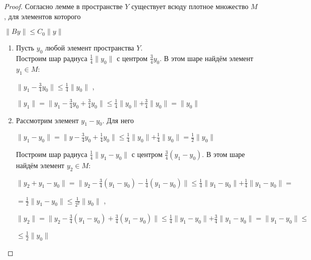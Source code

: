 \documentclass[12pt,a4paper,titlepage]{book}
\theoremstyle{definition}
\theoremstyle{plain}
\theoremstyle{remark}
\theoremstyle{remark}
\theoremstyle{remark}
\theoremstyle{plain}
\begin{document}
\begin{proof}
Согласно лемме в пространстве $Y$ существует всюду плотное множество $M$, для элементов которого
\begin{center}
	$\parallel By \parallel \leq C_0 \parallel y \parallel $
\end{center}
\begin{enumerate}

	\item Пусть $y_0$ любой элемент пространства $Y$.\\
	Построим шар радиуса $\frac{1}{4}\parallel y_0 \parallel$ с 		центром $\frac{3}{4}y_0$. В этом шаре найдём элемент
	$y_1 \in M$:
	\begin{center}
	$\parallel y_1 - \frac{3}{4}y_0\parallel \leq \frac{1}{4}    		\parallel y_0 \parallel $  ,
	\end{center}
	\begin{center}
	$\parallel y_1 \parallel =
	\parallel y_1 - \frac{3}{4}y_0 +
	\frac{3}{4}y_0 \parallel \leq \frac{1}{4} 			\parallel y_0 \parallel +
	 \frac{3}{4}\parallel y_0\parallel = 				\parallel y_0 \parallel$
	\end{center}
	
	\item Рассмотрим элемент $y_1 - y_0$. Для него
	\begin{center}
	$\parallel y_1-y_0 \parallel =\parallel y - \frac{3}{4}y_0 +
	\frac{1}{4}y_0 \parallel \leq
	\frac{1}{4} \parallel y_0 \parallel +
	\frac{1}{4} \parallel y_0 \parallel =
	\frac{1}{2} \parallel y_0 \parallel$
	\end{center}
	Построим шар радиуса $\frac{1}{4} \parallel 		y_1 - y_0 \parallel$ с центром $\frac{3}{4}			(y_1 - y_0)$. В этом шаре найдём элемент 			$y_2 \in M$:
	\begin{center}
	$\parallel y_2 + y_1 - y_0 \parallel =
	\parallel y_2 - \frac{3}{4}(y_1 - y_0) -
	\frac{1}{4}(y_1 - y_0) \parallel \leq
	\frac{1}{4} \parallel y_1 - y_0 \parallel +
	\frac{1}{4} \parallel y_1 - y_0 \parallel = $
	\end{center}
	\begin{center}
	$ = \frac{1}{2} \parallel y_1 - y_0 \parallel 			\leq
	\frac{1}{2^2} \parallel y_0 \parallel$ ,
	\end{center}
	\begin{center}
	$\parallel y_2 \parallel =
	\parallel y_2 - \frac{3}{4}(y_1 - y_0) +
	\frac{3}{4}(y_1 - y_0) \parallel \leq
	\frac{1}{4} \parallel y_1 - y_0 \parallel +
	\frac{3}{4} \parallel y_1 - y_0 \parallel =
	 \parallel y_1 - y_0 \parallel \leq$
	 \end{center}
	\begin{center}
	 $ \leq \frac{1}{2} \parallel y_0 \parallel$
	\end{center}
	

\end{enumerate}
\end{proof}
\end{document}
